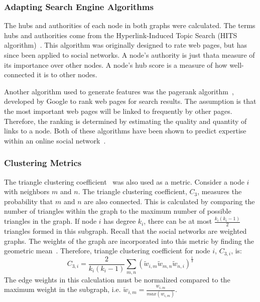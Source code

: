 \documentclass[12pt]{report}
\begin{document}
\subsubsection{Adapting Search Engine Algorithms}

The hubs and authorities of each node in both graphs were calculated.
The terms hubs and authorities come from the Hyperlink-Induced Topic Search (HITS algorithm)~\cite{kleinberg_hubs_1999}.
This algorithm was originally designed to rate web pages, but has since been applied to social networks.
A node's authority is just that\textemdash{}a measure of its importance over other nodes.
A node's hub score is a measure of how well-connected it is to other nodes.

Another algorithm used to generate features was the pagerank algorithm~\cite{page_pagerank_1999}, developed by Google to rank web pages for search results.
The assumption is that the most important web pages will be linked to frequently by other pages.
Therefore, the ranking is determined by estimating the quality and quantity of links to a node.
Both of these algorithms have been shown to predict expertise within an online social network~\cite{zhang_expertise_2007}.

\subsubsection{Clustering Metrics}
The triangle clustering coefficient~\cite{saramaki_generalizations_2007} was also used as a metric.
Consider a node $i$ with neighbors $m$ and $n$.
The triangle clustering coefficient, $C_3$,  measures the probability that $m$ and $n$ are also connected.
This is calculated by comparing the number of triangles within the graph to the maximum number of possible triangles in the graph.  If node $i$ has degree $k_i$, there can be at most $\frac{k_i(k_i-1)}{2}$ triangles formed in this subgraph.  Recall that the social networks are weighted graphs.  The weights of the graph are incorporated into this metric by finding the geometric mean~\cite{zhang_expertise_2007}.   Therefore, triangle clustering coefficient for node $i$, $C_{3,i}$, is:
\begin{equation}
C_{3,i} = \frac{2}{k_i(k_i-1)}\sum_{m,n}(\tilde{w}_{i,m}\tilde{w}_{m,n}\tilde{w}_{n,i})^\frac{1}{3}
\end{equation}
The edge weights in this calculation must be normalized compared to the maximum weight in the subgraph, i.e. $\tilde{w}_{i,m} = \frac{w_{i,m}}{max(w_{i,m})}$.
\end{document}
